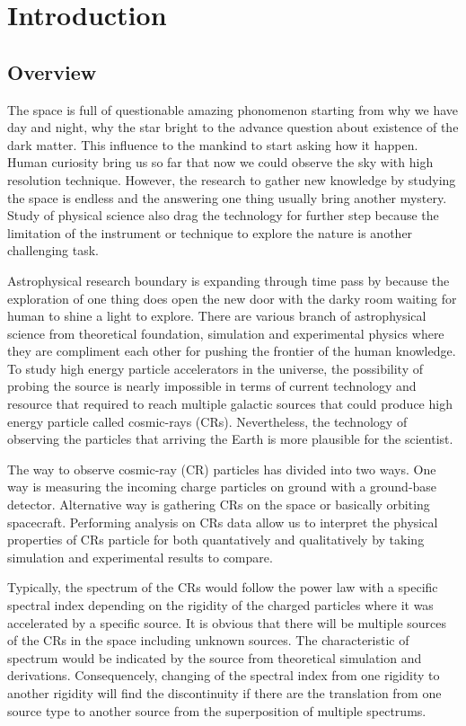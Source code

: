 \chapter{Introduction}


\section{Overview}
The space is full of questionable amazing phonomenon starting
from why we have day and night, why the star bright to 
the advance question about existence of the dark matter.
This influence to the mankind to start asking how it happen.
Human curiosity bring us so far that now we
could observe the sky with high resolution technique.
However, the research to gather new knowledge by studying
the space is endless and the answering one thing usually
bring another mystery. Study of physical science also
drag the technology for further step because the limitation
of the instrument or technique to explore the nature is 
another challenging task.

Astrophysical research boundary is expanding through time pass by
because the exploration of one thing does open the new door 
with the darky room waiting for human to shine a light to explore.
There are various branch of astrophysical science from theoretical
foundation, simulation and experimental physics where they are
compliment each other for pushing the frontier of the human knowledge.
To study high energy particle accelerators in the universe, the 
possibility of probing the source is nearly impossible in terms of 
current technology and resource that required to reach multiple 
galactic sources that could produce high energy particle called
cosmic-rays (CRs). Nevertheless, the technology of observing the 
particles that arriving the Earth is more plausible for the scientist.


The way to observe cosmic-ray (CR) particles has divided 
into two ways. One way is measuring the incoming charge particles on
ground with a ground-base detector. Alternative way is 
gathering CRs on the space or basically orbiting spacecraft.
Performing analysis on CRs data allow us to interpret the
physical properties of CRs particle for both quantatively
and qualitatively by taking simulation and experimental
results to compare.

Typically, the spectrum of the CRs would follow the power law with a
specific spectral index depending on the rigidity of the charged particles
where it was accelerated by a specific source. It is obvious that there
will be multiple sources of the CRs in the space including unknown sources.
The characteristic of spectrum would be indicated by the source from 
theoretical simulation and derivations. Consequencely, changing of 
the spectral index from one rigidity to another rigidity will find
the discontinuity if there are the translation from one source type 
to another source from the superposition of multiple spectrums.


